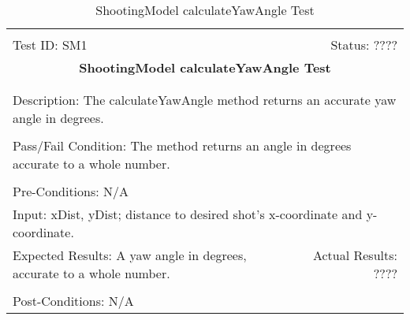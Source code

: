 \documentclass[11pt]{article}
\begin{document}
\begin{center}
\begin{table}[H]
\begin{tabular}{|l r|}\hline&\\[-2mm]
	Test ID: SM1	&Status: ????\\[-3mm]
	\multicolumn{2}{|c|}{\textbf{\large{ShootingModel calculateYawAngle Test}}}\\&\\\hline&\\[-3mm]
	\multicolumn{2}{|p{\textwidth}|}{Description: The calculateYawAngle method returns an accurate yaw angle in degrees.}\\[1mm]\hline&\\[-3mm]
	\multicolumn{2}{|p{\textwidth}|}{Pass/Fail Condition: The method returns an angle in degrees accurate to a whole number.}\\[1mm]\hline&\\[-3mm]
	\multicolumn{2}{|p{\textwidth}|}{Pre-Conditions: N/A}\\[4mm]
	\multicolumn{2}{|p{\textwidth}|}{Input: xDist, yDist; distance to desired shot's x-coordinate and y-coordinate.}\\[2mm]\hline
	\multicolumn{1}{|p{0.49\textwidth}}{Expected Results: A yaw angle in degrees, accurate to a whole number.}	&\multicolumn{1}{|p{0.45\textwidth}|}{Actual Results: ????}\\\hline&\\[-3mm]
	\multicolumn{2}{|p{\textwidth}|}{Post-Conditions: N/A}\\\hline
\end{tabular}
\caption{ShootingModel calculateYawAngle Test}
\end{table}
\end{center}
\end{document}
